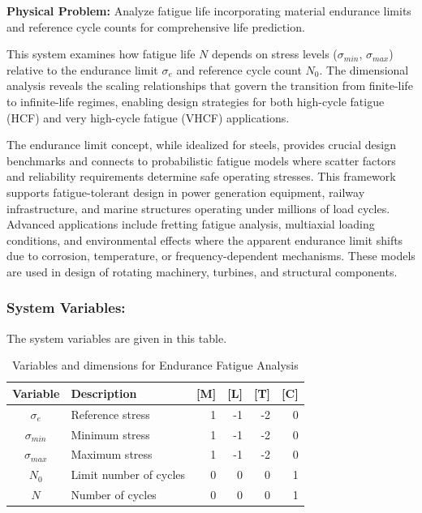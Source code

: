 \begin{problembox}
\textbf{Physical Problem:} Analyze fatigue life incorporating material endurance limits and reference cycle counts for comprehensive life prediction.
\end{problembox}
\begin{codebox}
This system examines how fatigue life $N$ depends on stress levels ($\sigma_{min}$, $\sigma_{max}$) relative to the endurance limit $\sigma_e$ and reference cycle count $N_0$. The dimensional analysis reveals the scaling relationships that govern the transition from finite-life to infinite-life regimes, enabling design strategies for both high-cycle fatigue (HCF) and very high-cycle fatigue (VHCF) applications.

The endurance limit concept, while idealized for steels, provides crucial design benchmarks and connects to probabilistic fatigue models where scatter factors and reliability requirements determine safe operating stresses. This framework supports fatigue-tolerant design in power generation equipment, railway infrastructure, and marine structures operating under millions of load cycles. Advanced applications include fretting fatigue analysis, multiaxial loading conditions, and environmental effects where the apparent endurance limit shifts due to corrosion, temperature, or frequency-dependent mechanisms.  These models are used in design of rotating machinery, turbines, and structural components.
\end{codebox}

\subsubsection*{System Variables: } The system variables are given in this table.

\begin{table}[htpb]
\centering
\begin{tabular}{|c|l|r|r|r|r|}
\hline
\textbf{Variable} & \textbf{Description} & \textbf{[M]} & \textbf{[L]} & \textbf{[T]} & \textbf{[C]} \\
\hline
$\sigma_e$ & Reference stress & 1 & -1 & -2 & 0 \\
$\sigma_{min}$ & Minimum stress & 1 & -1 & -2 & 0 \\
$\sigma_{max}$ & Maximum stress & 1 & -1 & -2 & 0 \\
$N_0$ & Limit number of cycles & 0 & 0 & 0 & 1 \\
$N$ & Number of cycles & 0 & 0 & 0 & 1 \\
\hline
\end{tabular}
\caption{Variables and dimensions for Endurance Fatigue Analysis}
\end{table}

